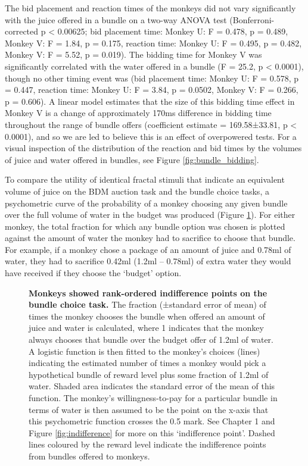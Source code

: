 The bid placement and reaction times of the monkeys did not vary significantly with the juice offered in a bundle on a two-way ANOVA test (Bonferroni-corrected p < 0.00625; bid placement time: Monkey U: F = 0.478, p = 0.489, Monkey V: F = 1.84, p = 0.175, reaction time: Monkey U: F = 0.495, p = 0.482, Monkey V: F = 5.52, p = 0.019). The bidding time for Monkey V was significantly correlated with the water offered in a bundle (F = 25.2, p < 0.0001), though no other timing event was (bid placement time: Monkey U: F = 0.578, p = 0.447, reaction time: Monkey U: F = 3.84, p = 0.0502, Monkey V: F = 0.266, p = 0.606). A linear model estimates that the size of this bidding time effect in Monkey V is a change of approximately 170ms difference in bidding time throughout the range of bundle offers (coefficient estimate = 169.58±33.81, p < 0.0001), and so we are led to believe this is an effect of overpowered tests. For a visual inspection of the distribution of the reaction and bid times by the volumes of juice and water offered in bundles, see Figure \ref{fig:bundle_bidding}.

To compare the utility of identical fractal stimuli that indicate an equivalent volume of juice on the BDM auction task and the bundle choice tasks, a psychometric curve of the probability of a monkey choosing any given bundle over the full volume of water in the budget was produced (Figure \ref{fig:bundle_indifference}). For either monkey, the total fraction for which any bundle option was chosen is plotted against the amount of water the monkey had to sacrifice to choose that bundle. For example, if a monkey chose a package of an amount of juice and 0.78ml of water, they had to sacrifice 0.42ml (1.2ml – 0.78ml) of extra water they would have received if they choose the ‘budget’ option.

\begin{figure}[htbp!] 
\centering    

\caption[Monkeys showed rank-ordered indifference points on the bundle choice task.]{\textbf{Monkeys showed rank-ordered indifference points on the bundle choice task.} The fraction (±standard error of mean) of times the monkey chooses the bundle when offered an amount of juice and water is calculated, where 1 indicates that the monkey always chooses that bundle over the budget offer of 1.2ml of water. A logistic function is then fitted to the monkey’s choices (lines) indicating the estimated number of times a monkey would pick a hypothetical bundle of reward level plus some fraction of 1.2ml of water. Shaded area indicates the standard error of the mean of this function. The monkey’s willingness-to-pay for a particular bundle in terms of water is then assumed to be the point on the x-axis that this psychometric function crosses the 0.5 mark. See Chapter 1 and Figure \ref{fig:indifference} for more on this ‘indifference point’. Dashed lines coloured by the reward level indicate the indifference points from bundles offered to monkeys.}
\label{fig:bundle_indifference}
\end{figure}

